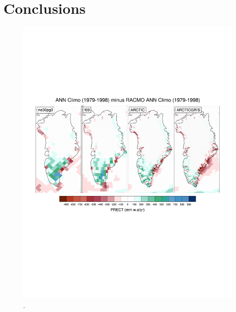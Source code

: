 \documentclass[draft]{agujournal2019}
\begin{document}
\section{Conclusions}\label{sec:conclusions}

\begin{figure}[t]
\begin{center}
         \includegraphics[width=130mm]{figs/temp_PRECT.pdf}
\end{center}
\caption{.}
\label{fig:prect}
\end{figure}
\end{document}
